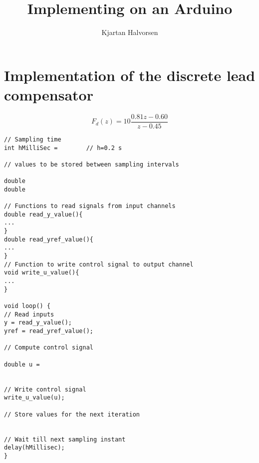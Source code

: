 \documentclass[letterpaper]{scrartcl}
\author{Kjartan Halvorsen}
\date{}
\title{Implementing on an Arduino}
\begin{document}
\maketitle

\section*{Implementation of the discrete lead compensator}
\label{sec-1}
\[F_d(z) = 10 \frac{0.81z - 0.60}{z-0.45}\]


\begin{verbatim}
// Sampling time
int hMilliSec =        // h=0.2 s

// values to be stored between sampling intervals

double 
double

// Functions to read signals from input channels
double read_y_value(){
...
}
double read_yref_value(){
...
}
// Function to write control signal to output channel
void write_u_value(){
...
}

void loop() {
// Read inputs
y = read_y_value();
yref = read_yref_value();

// Compute control signal

double u = 


// Write control signal 
write_u_value(u);

// Store values for the next iteration


// Wait till next sampling instant
delay(hMillisec);
}
\end{verbatim}
\end{document}
